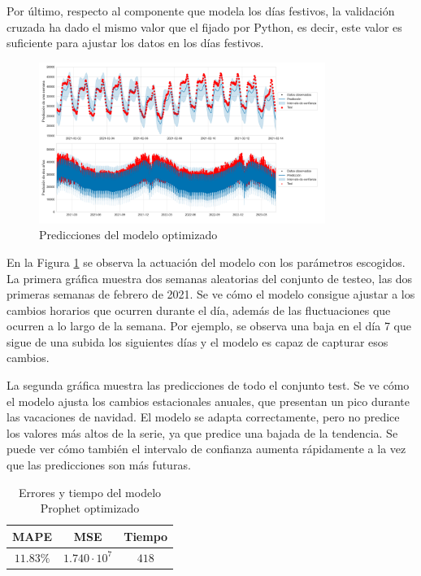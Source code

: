 \documentclass[12pt,twoside]{article}
\begin{document}
Por último, respecto al componente que modela los días festivos, la validación cruzada ha dado el mismo valor que el fijado por Python, es decir, este valor es suficiente para ajustar los datos en los días festivos.
\begin{figure}[h]
\centering
    \includegraphics[width =0.83\textwidth]{imagenes/prophet_pred2.png}
    \caption{Predicciones del modelo optimizado}\label{fig:prophet_pred2}
\end{figure}


En la Figura \ref{fig:prophet_pred2} se observa la actuación del modelo con los parámetros escogidos. La primera gráfica muestra dos semanas aleatorias del conjunto de testeo, las dos primeras semanas de febrero de 2021. Se ve cómo el modelo consigue ajustar a los cambios horarios que ocurren durante el día, además de las fluctuaciones que ocurren a lo largo de la semana. Por ejemplo, se observa una baja en el día 7 que sigue de una subida los siguientes días y el modelo es capaz de capturar esos cambios.

La segunda gráfica muestra las predicciones de todo el conjunto test. Se ve cómo el modelo ajusta los cambios estacionales anuales, que presentan un pico durante las vacaciones de navidad. El modelo se adapta correctamente, pero no predice los valores más altos de la serie, ya que predice una bajada de la tendencia. Se puede ver cómo también el intervalo de confianza aumenta rápidamente a la vez que las predicciones son más futuras.
\begin{table}[h]
    \centering
    \begin{tabular}{ccc} \hline
        MAPE & MSE & Tiempo \\ \hline
        $11.83\%$ & $1.740\cdot10^7$ &  $418$ \\\hline
    \end{tabular}
    \caption{Errores y tiempo del modelo Prophet optimizado}
    \label{tab:Prophet_error}
\end{table}
\end{document}

